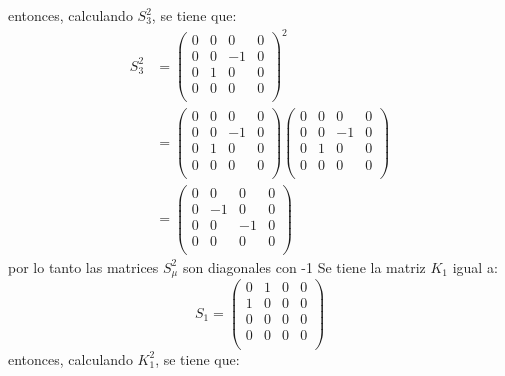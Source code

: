     entonces, calculando $S_3^2$, se tiene que:
    \begin{align*}
        S_3^2 &=\left( \begin{matrix}
            0 & 0 & 0 & 0 \\
            0 & 0 & -1 & 0 \\
            0 & 1 & 0 & 0 \\
            0 & 0 & 0 & 0 \\
        \end{matrix}\right)^2 \\
        & =\left( \begin{matrix}
            0 & 0 & 0 & 0 \\
            0 & 0 & -1 & 0 \\
            0 & 1 & 0 & 0 \\
            0 & 0 & 0 & 0 \\
        \end{matrix}\right)\left( \begin{matrix}
            0 & 0 & 0 & 0 \\
            0 & 0 & -1 & 0 \\
            0 & 1 & 0 & 0 \\
            0 & 0 & 0 & 0 \\
        \end{matrix}\right)\\
        & =\left( \begin{matrix}
            0 & 0 & 0 & 0 \\
            0 & -1 & 0 & 0 \\
            0 & 0 & -1 & 0 \\
            0 & 0 & 0 & 0 \\
        \end{matrix}\right)
    \end{align*}
    por lo tanto las matrices $S_\mu^2$ son diagonales con -1
    Se tiene la matriz $K_1$ igual a:
    \begin{equation*}
        S_1 =\left( \begin{matrix}
            0 & 1 & 0 & 0 \\
            1 & 0 & 0 & 0 \\
            0 & 0 & 0 & 0 \\
            0 & 0 & 0 & 0 \\
        \end{matrix}\right)
    \end{equation*}
    entonces, calculando $K_1^2$, se tiene que:
